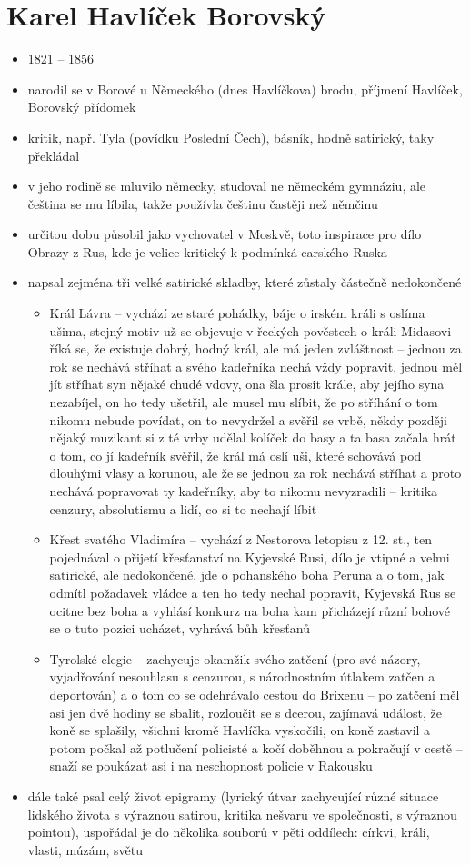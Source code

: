 \documentclass{article}
\begin{document}
\section{Karel Havlíček Borovský}
\begin{itemize}
  \item 1821 -- 1856
  \item narodil se v Borové u Německého (dnes Havlíčkova) brodu, příjmení Havlíček, Borovský přídomek
  \item kritik, např. Tyla (povídku Poslední Čech), básník, hodně satirický, taky překládal
  \item v jeho rodině se mluvilo německy, studoval ne německém gymnáziu, ale čeština se mu líbila, takže používla češtinu častěji než němčinu
  \item určitou dobu působil jako vychovatel v Moskvě, toto inspirace pro dílo Obrazy z Rus, kde je velice kritický k podmínká carského Ruska
  \item napsal zejména tři velké satirické skladby, které zůstaly částečně nedokončené
  \begin{itemize}
    \item Král Lávra -- vychází ze staré pohádky, báje o irském králi s oslíma
     ušima, stejný motiv už se objevuje v řeckých pověstech o králi Midasovi -- říká se, že existuje dobrý, hodný král, ale má jeden zvláštnost -- jednou za rok se nechává stříhat a svého kadeřníka nechá vždy popravit, jednou měl jít stříhat syn nějaké chudé vdovy, ona šla prosit krále, aby jejího syna nezabíjel, on ho tedy ušetřil, ale musel mu slíbit, že po stříhání o tom nikomu nebude povídat, on to nevydržel a svěřil se vrbě, někdy později nějaký muzikant si z té vrby udělal kolíček do basy a ta basa začala hrát o tom, co jí kadeřník svěřil, že král má oslí uši, které schovává pod dlouhými vlasy a korunou, ale že se jednou za rok nechává stříhat a proto nechává popravovat ty kadeřníky, aby to nikomu nevyzradili -- kritika cenzury, absolutismu a lidí, co si to nechají líbit
    \item Křest svatého Vladimíra -- vychází z Nestorova letopisu z 12. st., ten pojednával o přijetí křesťanství na Kyjevské Rusi, dílo je vtipné a velmi satirické, ale nedokončené, jde o pohanského boha Peruna a o tom, jak odmítl požadavek vládce a ten ho tedy nechal popravit, Kyjevská Rus se ocitne bez boha a vyhlásí konkurz na boha kam přicházejí různí bohové se o tuto pozici ucházet, vyhrává bůh křesťanů
    \item Tyrolské elegie -- zachycuje okamžik svého zatčení (pro své názory, vyjadřování nesouhlasu s cenzurou, s národnostním útlakem zatčen a deportován) a o tom co se odehrávalo cestou do Brixenu -- po zatčení měl asi jen dvě hodiny se sbalit, rozloučit se s dcerou, zajímavá událost, že koně se splašily, všichni kromě Havlíčka vyskočili, on koně zastavil a potom počkal až potlučení policisté a kočí doběhnou a pokračují v cestě -- snaží se poukázat asi i na neschopnost policie v Rakousku
  \end{itemize}
  \item dále také psal celý život epigramy (lyrický útvar zachycující různé situace lidského života s výraznou satirou, kritika nešvaru ve společnosti, s výraznou pointou), uspořádal je do několika souborů v pěti oddílech: církvi, králi, vlasti, múzám, světu
\end{itemize}
\end{document}
